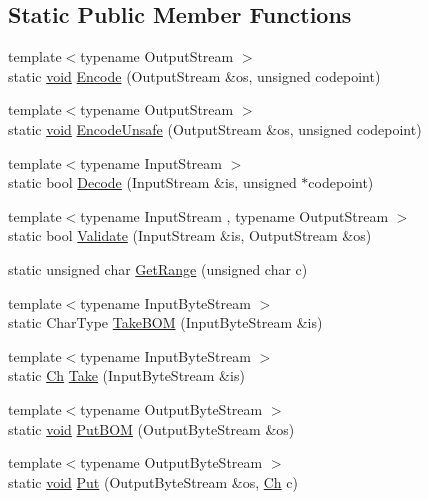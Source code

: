 \subsection*{Static Public Member Functions}
\begin{DoxyCompactItemize}
\item 
{\footnotesize template$<$typename Output\+Stream $>$ }\\static \hyperlink{imgui__impl__opengl3__loader_8h_ac668e7cffd9e2e9cfee428b9b2f34fa7}{void} \hyperlink{structUTF8_af286ed19ca60d261a9b11b65bee1298b}{Encode} (Output\+Stream \&os, unsigned codepoint)
\item 
{\footnotesize template$<$typename Output\+Stream $>$ }\\static \hyperlink{imgui__impl__opengl3__loader_8h_ac668e7cffd9e2e9cfee428b9b2f34fa7}{void} \hyperlink{structUTF8_aac6bdaf03c114265384b2ae3e425e7a8}{Encode\+Unsafe} (Output\+Stream \&os, unsigned codepoint)
\item 
{\footnotesize template$<$typename Input\+Stream $>$ }\\static bool \hyperlink{structUTF8_a17c6badb31acf4f784111c886737fb17}{Decode} (Input\+Stream \&is, unsigned $\ast$codepoint)
\item 
{\footnotesize template$<$typename Input\+Stream , typename Output\+Stream $>$ }\\static bool \hyperlink{structUTF8_a9e2e7e37d819baeb5e643654c6e61e33}{Validate} (Input\+Stream \&is, Output\+Stream \&os)
\item 
static unsigned char \hyperlink{structUTF8_ac06bbf38df41adb0c7b9eaa93f85cc38}{Get\+Range} (unsigned char c)
\item 
{\footnotesize template$<$typename Input\+Byte\+Stream $>$ }\\static Char\+Type \hyperlink{structUTF8_a1b2359d6ea50ae32fefc9b28e9878a31}{Take\+B\+OM} (Input\+Byte\+Stream \&is)
\item 
{\footnotesize template$<$typename Input\+Byte\+Stream $>$ }\\static \hyperlink{structUTF8_a8e78c8113f3660178d8121b7d3e55890}{Ch} \hyperlink{structUTF8_a5b2561a5031c8a699e593cd51b2c6864}{Take} (Input\+Byte\+Stream \&is)
\item 
{\footnotesize template$<$typename Output\+Byte\+Stream $>$ }\\static \hyperlink{imgui__impl__opengl3__loader_8h_ac668e7cffd9e2e9cfee428b9b2f34fa7}{void} \hyperlink{structUTF8_a6b171e5f0662ad81d498875bbdbc536a}{Put\+B\+OM} (Output\+Byte\+Stream \&os)
\item 
{\footnotesize template$<$typename Output\+Byte\+Stream $>$ }\\static \hyperlink{imgui__impl__opengl3__loader_8h_ac668e7cffd9e2e9cfee428b9b2f34fa7}{void} \hyperlink{structUTF8_ab24c23227413798e9be28a21eb26fe51}{Put} (Output\+Byte\+Stream \&os, \hyperlink{structUTF8_a8e78c8113f3660178d8121b7d3e55890}{Ch} c)
\end{DoxyCompactItemize}


